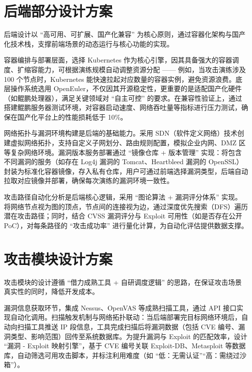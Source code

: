 \documentclass[lang=cn,10pt]{elegantbook}
\begin{document}
\section{后端部分设计方案}
后端设计以 “高可用、可扩展、国产化兼容” 为核心原则，通过容器化架构与国产化技术栈，支撑前端场景的动态运行与核心功能的实现。​

容器编排与部署层面，选择 Kubernetes 作为核心引擎，因其具备强大的容器调度、扩缩容能力，可根据演练规模自动调整资源分配 —— 例如，当攻击演练涉及 100 个节点时，Kubernetes 能快速拉起对应数量的容器实例，避免资源浪费。底层操作系统选用 OpenEuler，不仅因其开源稳定性，更重要的是适配国产化硬件（如鲲鹏处理器），满足关键领域对 “自主可控” 的要求。在兼容性验证上，通过搭建鲲鹏服务器测试环境，对容器启动速度、网络吞吐量等指标进行压力测试，确保在国产化平台上的性能损耗低于 10\%。​

网络拓扑与漏洞环境构建是后端的基础能力。采用 SDN（软件定义网络）技术创建虚拟网络拓扑，支持自定义子网划分、路由规则配置，模拟企业内网、DMZ 区等复杂网络环境。漏洞版本服务部署通过 “镜像仓库 + 版本管理” 实现：将包含不同漏洞的服务（如存在 Log4j 漏洞的 Tomcat、Heartbleed 漏洞的 OpenSSL）封装为标准化容器镜像，存入私有仓库，用户可通过前端选择漏洞类型，后端自动拉取对应镜像并部署，确保每次演练的漏洞环境一致性。​

攻击路径自动化分析是后端核心逻辑，采用 “图论算法 + 漏洞评分体系” 实现。将网络节点视为图的顶点，节点间的连接视为边，通过深度优先搜索（DFS）遍历潜在攻击路径；同时，结合 CVSS 漏洞评分与 Exploit 可用性（如是否存在公开 PoC），对每条路径的 “攻击成功率” 进行量化计算，为自动化评估提供数据支撑。

\section{攻击模块设计方案}
攻击模块的设计遵循 “借力成熟工具 + 自研调度逻辑” 的思路，在保证攻击场景真实性的同时，降低开发成本。​

漏洞信息获取环节，集成 Nessus、OpenVAS 等成熟扫描工具，通过 API 接口实现自动化调用。扫描触发机制与网络拓扑联动：当后端部署完目标网络环境后，自动向扫描工具推送 IP 段信息，工具完成扫描后将漏洞数据（包括 CVE 编号、漏洞类型、影响范围）回传至系统数据库。为提升漏洞与 Exploit 的匹配效率，设计 “漏洞 - Exploit 映射引擎”，基于 CVE 编号关联 Exploit-DB、Metasploit 等数据库，自动筛选可用攻击脚本，并标注利用难度（如 “低：无需认证”“高：需绕过沙箱”）。​
\end{document}
